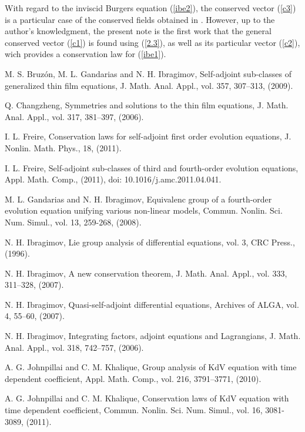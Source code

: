 \documentclass[11pt,letterpaper,twoside]{article}
\begin{document}
With regard to the inviscid Burgers equation (\ref{ibe2}), the conserved vector (\ref{c3}) is a particular case of the conserved fields obtained in \cite{ijnmp}. However, up to the author's knowledgment, the present note is the first work that the general conserved vector (\ref{c1}) is found using (\ref{2.3}), as well as its particular vector (\ref{c2}), wich provides a conservation law for (\ref{ibe1}).



\begin{thebibliography}{99}

 M. S. Bruzón, M. L. Gandarias and N. H. Ibragimov, Self-adjoint sub-classes of generalized thin film equations, J. Math. Anal. Appl., vol. 357, 307--313, (2009).

 Q. Changzheng, Symmetries and solutions to the thin film equations, J. Math. Anal. Appl., vol. 317, 381--397, (2006). 

 I. L. Freire, Conservation laws for self-adjoint first order evolution equations, J. Nonlin. Math. Phys., 18, (2011).

 I. L. Freire, Self-adjoint sub-classes of third and fourth-order evolution equations, Appl. Math. Comp., (2011), doi: 10.1016/j.amc.2011.04.041.

 M. L. Gandarias and N. H. Ibragimov, Equivalenc group of a fourth-order evolution equation unifying various non-linear models, Commun. Nonlin. Sci. Num. Simul., vol. 13, 259-268, (2008). 


 N. H. Ibragimov, Lie group analysis of differential equations, vol. 3, CRC Press., (1996).

 N. H. Ibragimov, A new conservation theorem, J. Math. Anal. Appl., vol. 333, 311--328, (2007).

 N. H. Ibragimov, Quasi-self-adjoint differential equations, Archives of ALGA,  vol. 4, 55--60, (2007).

 N. H. Ibragimov, Integrating factors, adjoint equations and Lagrangians, J. Math. Anal. Appl., vol. 318, 742--757, (2006).

 A. G. Johnpillai and C. M. Khalique, Group analysis of KdV equation with time dependent coefficient, Appl. Math. Comp., vol. 216, 3791--3771, (2010).

 A. G. Johnpillai and C. M. Khalique, Conservation laws of KdV equation with time dependent coefficient, Commun. Nonlin. Sci. Num. Simul., vol. 16, 3081-3089, (2011).


\end{thebibliography}
\end{document}
